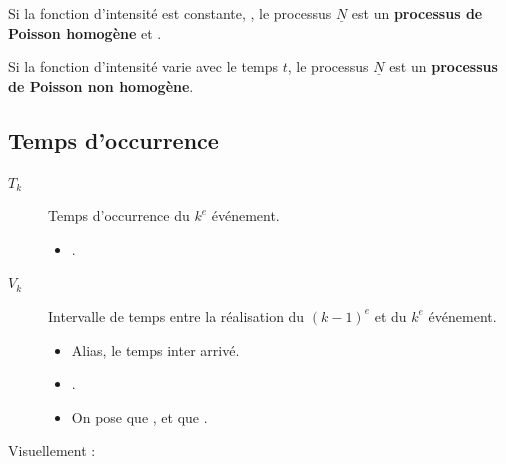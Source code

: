 \documentclass[10pt, french]{article}
\begin{document}
\begin{multicols*}{2}
\begin{definitionNOHFILLsub}
\begin{definitionNOHFILLprop}
Si la fonction d'intensité est constante, , le processus $\underline{N}$ est un \textbf{processus de Poisson homogène} et .
\end{definitionNOHFILLprop}

\begin{definitionNOHFILLprop}
Si la fonction d'intensité varie avec le temps $t$, le processus $\underline{N}$ est un \textbf{processus de Poisson non homogène}.
\end{definitionNOHFILLprop}
\end{definitionNOHFILLsub}


\columnbreak
\subsection{Temps d'occurrence}
\begin{distributions}[Notation]
\begin{description}
	\item[$T_{k}$]	Temps d'occurrence du $k^{e}$ événement.
		\begin{itemize}
		\item	{}.
		\end{itemize}
	\item[$V_{k}$]	Intervalle de temps entre la réalisation du $(k - 1)^{e}$ et du $k^{e}$ événement.
		\begin{itemize}
		\item	Alias, le temps inter arrivé.
		\item	{}.
		\item	On pose que ,  et que .
		\end{itemize}
\end{description}
\end{distributions}

Visuellement : 
\begin{center}
\begin{tikzpicture}[x=0.75pt,y=0.75pt,yscale=-1,xscale=1]


\end{tikzpicture}
\end{center}
\end{multicols*}
\end{document}
